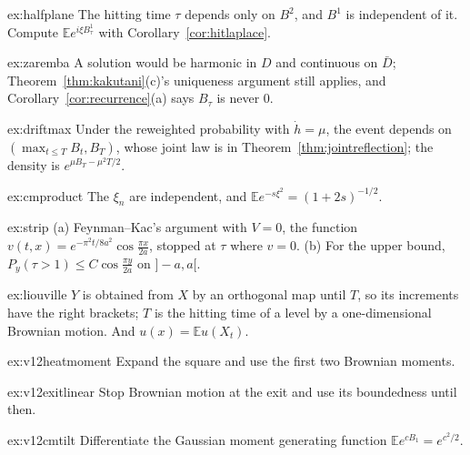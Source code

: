 \begin{hint}{ex:halfplane}
The hitting time $\tau$ depends only on $B^2$, and $B^1$ is independent of it. Compute $\mathbb Ee^{i\xi B^1_\tau}$ with Corollary~\ref{cor:hitlaplace}.
\end{hint}

\begin{hint}{ex:zaremba}
A solution would be harmonic in $D$ and continuous on $\bar D$; Theorem~\ref{thm:kakutani}(c)'s uniqueness argument still applies, and Corollary~\ref{cor:recurrence}(a) says $B_\tau$ is never $0$.
\end{hint}

\begin{hint}{ex:driftmax}
Under the reweighted probability with $\dot h=\mu$, the event depends on $(\max_{t\le T}B_t,B_T)$, whose joint law is in Theorem~\ref{thm:jointreflection}; the density is $e^{\mu B_T-\mu^2T/2}$.
\end{hint}

\begin{hint}{ex:cmproduct}
The $\xi_n$ are independent, and $\mathbb Ee^{-s\xi^2}=(1+2s)^{-1/2}$.
\end{hint}

\begin{hint}{ex:strip}
(a) Feynman--Kac's argument with $V=0$, the function $v(t,x)=e^{-\pi^2t/8a^2}\cos\frac{\pi x}{2a}$, stopped at $\tau$ where $v=0$. (b) For the upper bound, $P_y(\tau>1)\le C\cos\frac{\pi y}{2a}$ on $]-a,a[$.
\end{hint}

\begin{hint}{ex:liouville}
$Y$ is obtained from $X$ by an orthogonal map until $T$, so its increments have the right brackets; $T$ is the hitting time of a level by a one-dimensional Brownian motion. And $u(x)=\mathbb Eu(X_t)$.
\end{hint}

\begin{hint}{ex:v12heatmoment}
Expand the square and use the first two Brownian moments.
\end{hint}

\begin{hint}{ex:v12exitlinear}
Stop Brownian motion at the exit and use its boundedness until then.
\end{hint}

\begin{hint}{ex:v12cmtilt}
Differentiate the Gaussian moment generating function $\mathbb Ee^{cB_1}=e^{c^2/2}$.
\end{hint}

